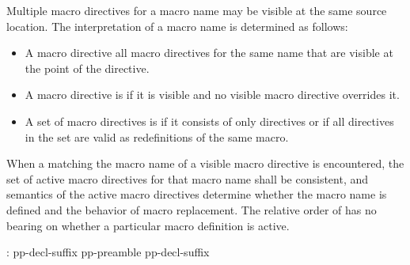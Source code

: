 \begin{after}
\begin{std.txt}
\alinea
Multiple macro directives for a macro name may be visible at the same
source location.
The interpretation of a macro name is determined as follows:
\begin{itemize}
\item
\color{addclr}
A macro directive  all macro directives for the same name
that are visible at the point of the directive.
\item
\color{addclr}
A macro directive is  if it is visible and
no visible macro directive overrides it.
\item
\color{addclr}
A set of macro directives is  if it consists of only
 directives or if all  directives in the set
are valid as redefinitions of the same macro.
\end{itemize}
\color{addclr}
When a  matching the macro name of a visible
macro directive is encountered, the set of active macro directives for that
macro name shall be consistent, and semantics of the active macro directives
determine whether the macro name is defined and the behavior of macro
replacement.
\enternote
The relative order of  has no bearing on whether a
particular macro definition is active.
\exitnote

\begin{bnf}
:\br
   pp-decl-suffix \terminal{;}\br
  pp-preamble \opt{}  pp-decl-suffix \terminal{;}
\end{bnf}


\end{std.txt}
\end{after}
